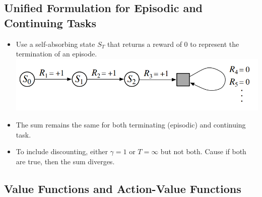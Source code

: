 \subsection{Unified Formulation for Episodic and Continuing Tasks}

\begin{itemize}
    \item Use a self-absorbing state \(S_T\) that returns a reward of 0 to represent the termination of an episode.
    \subitem \includegraphics[scale=0.3]{./self_absorb.png}
    \item The sum remains the same for both terminating (episodic) and continuing task. 
    \item To include discounting, either \(\gamma = 1\) or \(T = \infty\) but not both. Cause if both are true, then the sum diverges.
\end{itemize} 










\subsection{Value Functions and Action-Value Functions}

